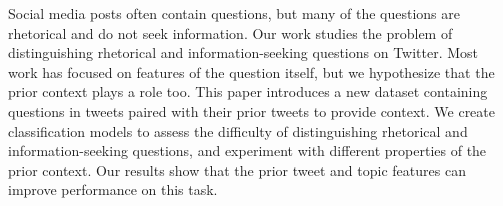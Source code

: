 Social media posts often contain questions, but many of the questions are rhetorical and do not seek information. Our work studies the problem of distinguishing rhetorical and information-seeking questions on Twitter. Most work has focused on features of the question itself, but we hypothesize that the prior context plays a role too. This paper introduces a new dataset containing questions in tweets paired with their prior tweets to provide context. We create classification models to assess the difficulty of distinguishing rhetorical and information-seeking questions, and experiment with different properties of the prior context. Our results show that the prior tweet and topic features can improve performance on this task.
